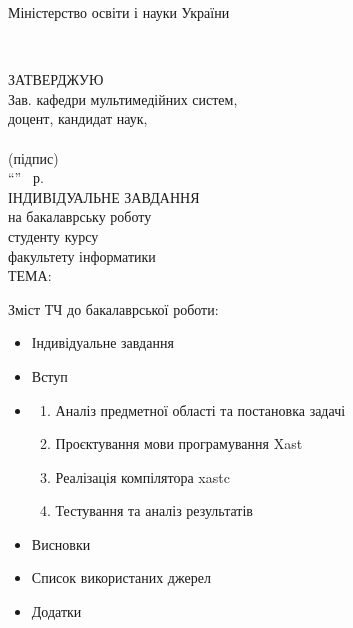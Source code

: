 \begin{center}
    {\large Міністерство освіти і науки України\par}\vspace{0.5em}
    {\large \university\\ \department\par}\vspace{0.5em}

    {\large ЗАТВЕРДЖУЮ}\\
    {\large Зав. кафедри мультимедійних систем,}\\
    {\large доцент, кандидат наук,}\\
    {\large \underline{\hspace{3cm}} \headofdepartment}\\
    {\mbox{\large (підпис) \hspace{4cm}}}\\
    ``\underline{\hspace{1cm}}'' \underline{\hspace{3cm}} \thesisyear~р.\\[1em]

    {\large ІНДИВІДУАЛЬНЕ ЗАВДАННЯ}\\[0.5em]
    {\large на бакалаврську роботу}\\[0.5em]
    студенту \studentdative{} \studentyear{} курсу\\факультету інформатики\\[0.5em]

    ТЕМА: \thesistopic\\[0.5em]

    \begin{flushleft}
        Зміст ТЧ до бакалаврської роботи:
        \begin{itemize}[itemsep=0pt, parsep=0pt, topsep=0pt, label={}, leftmargin=18pt]
            \item Індивідуальне завдання
            \item Вступ
            \item \begin{enumerate}[itemsep=0pt, parsep=0pt, topsep=0pt]
                \item Аналіз предметної області та постановка задачі
                \item Проєктування мови програмування Xast
                \item Реалізація компілятора xastc
                \item Тестування та аналіз результатів
            \end{enumerate}
            \item Висновки
            \item Список використаних джерел
            \item Додатки
        \end{itemize}
        \vspace{0.25em}


\end{flushleft}
\end{center}
